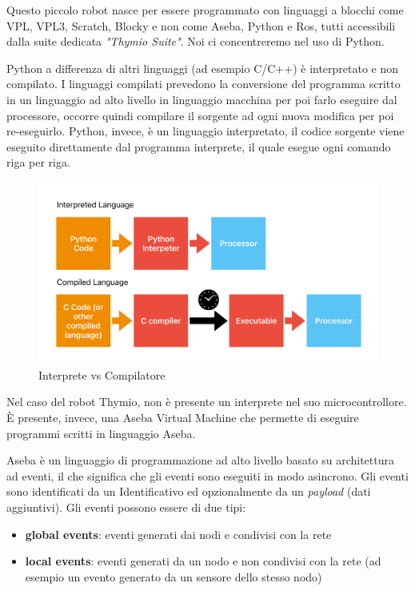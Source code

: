 \documentclass[12pt,a4paper,openright,twoside]{book}
\begin{document}
Questo piccolo robot nasce per essere programmato con linguaggi a blocchi come VPL, VPL3, Scratch, Blocky e non come Aseba, Python e Ros, tutti accessibili dalla suite dedicata \textit{"Thymio Suite"}.
Noi ci concentreremo nel uso di Python. 

Python a differenza di altri linguaggi (ad esempio C/C++) è interpretato e non compilato. I linguaggi compilati prevedono la conversione del programma scritto in un linguaggio ad alto livello in linguaggio macchina per poi farlo eseguire dal processore, occorre quindi compilare il sorgente ad ogni nuova modifica per poi re-eseguirlo. Python, invece, è un linguaggio interpretato, il codice sorgente viene eseguito direttamente dal programma interprete, il quale esegue ogni comando riga per riga.

\begin{figure}
    \centering
    \includegraphics[width=.8\linewidth]{figures/interpreter-compiler.pdf}
    \caption{Interprete vs Compilatore}
    \label{fig:interpreter-vs-compiler}
\end{figure}

Nel caso del robot Thymio, non è presente un interprete nel suo microcontrollore. È presente, invece, una Aseba Virtual Machine che permette di eseguire programmi scritti in linguaggio Aseba. 

Aseba è un linguaggio di programmazione ad alto livello basato su architettura ad eventi, il che significa che gli eventi sono eseguiti in modo asincrono. Gli eventi sono identificati da un Identificativo ed opzionalmente da un \textit{payload} (dati aggiuntivi). 
Gli eventi possono essere di due tipi:
\begin{itemize}
    \item \textbf{global events}: eventi generati dai nodi e condivisi con la rete
    \item \textbf{local events}: eventi generati da un nodo e non condivisi con la rete (ad esempio un evento generato da un sensore dello stesso nodo)
\end{itemize}
\end{document}
